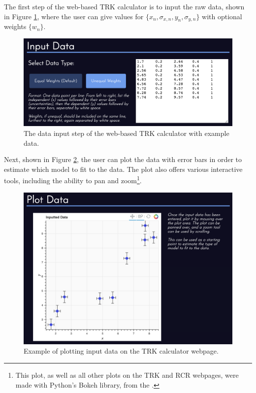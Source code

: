 The first step of the web-based TRK calculator is to input the raw data, shown in Figure \ref{fig:websiteinput}, where the user can give values for $\{x_n,\sigma_{x,n},y_n,\sigma_{y,n}\}$ with optional weights $\{w_n\}$.
\begin{figure}
    \centering
    \includegraphics[width=1.0\linewidth]{figures/websiteinput.png}
    \caption{The data input step of the web-based TRK calculator with example data.}
    \label{fig:websiteinput}
\end{figure}
Next, shown in Figure \ref{fig:websiteinputplot}, the user can plot the data with error bars in order to estimate which model to fit to the data. The plot also offers various interactive tools, including the ability to pan and zoom\footnote{This plot, as well as all other plots on the TRK and RCR webpages, were made with Python's Bokeh library, from the \textcite{bokeh}.}.
\begin{figure}
    \centering
    \includegraphics[width=1.0\linewidth]{figures/websiteinputplot.png}
    \caption{Example of plotting input data on the TRK calculator webpage.}
    \label{fig:websiteinputplot}
\end{figure}

